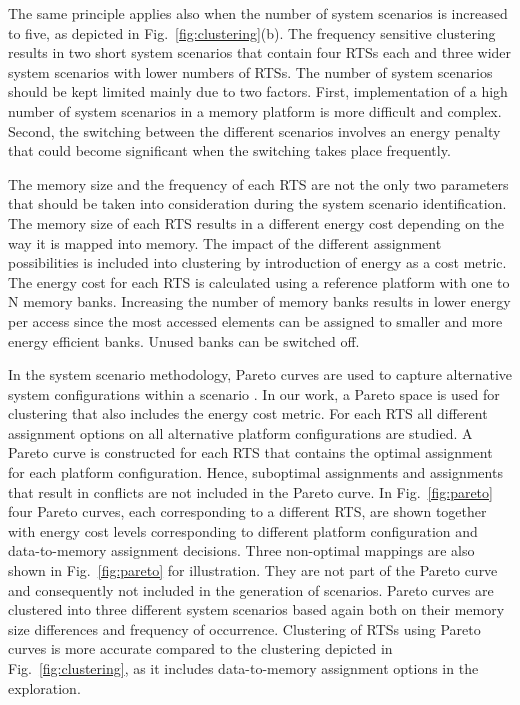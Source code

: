 \documentclass[smallcondensed]{svjour3}
\begin{document}
The same principle applies also when the number of system scenarios is increased to five, as depicted in Fig.~\ref{fig:clustering}(b). 
The frequency sensitive clustering results in two short system scenarios that contain four RTSs each and three wider system scenarios with lower numbers of RTSs. 
The number of system scenarios should be kept limited mainly due to two factors. 
First, implementation of a high number of system scenarios in a memory platform is more difficult and complex. 
Second, the switching between the different scenarios involves an energy penalty that could become significant when the switching takes place frequently.

The memory size and the frequency of each RTS are not the only two parameters that should be taken into consideration during the system scenario identification. 
The memory size of each RTS results in a different energy cost depending on the way it is mapped into memory. 
The impact of the different assignment possibilities is included into clustering by introduction of energy as a cost metric. 
The energy cost for each RTS is calculated using a reference platform with one to N
memory banks. 
Increasing the number of memory banks results in lower energy per access since the most accessed elements can be assigned to smaller and more energy efficient banks. Unused banks can be switched off.

In the system scenario methodology, Pareto curves are used to capture alternative system configurations within a scenario \cite{tcm}. 
In our work, a Pareto space is used for clustering that also includes the energy cost metric. 
For each RTS all different assignment options on all alternative platform configurations are studied. 
A Pareto curve is constructed for each RTS that contains the optimal assignment for each platform configuration. 
Hence, suboptimal assignments and assignments that result in conflicts are not included in the Pareto curve. 
In Fig.~\ref{fig:pareto} four Pareto curves, each corresponding to a different RTS, are shown together with energy cost levels corresponding to different platform configuration and data-to-memory assignment decisions. 
Three non-optimal mappings are also shown in Fig.~\ref{fig:pareto} for illustration. 
They are not part of the Pareto curve and consequently not included in the generation of scenarios. 
Pareto curves are clustered into three different system scenarios based again both on their memory size differences and frequency of occurrence. 
Clustering of RTSs using Pareto curves is more accurate compared to the clustering depicted in Fig.~\ref{fig:clustering}, as it includes data-to-memory assignment options in the exploration. 
\end{document}
